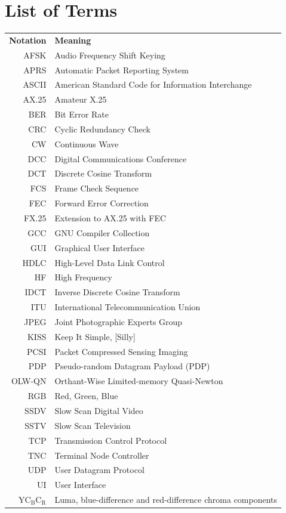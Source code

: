 \documentclass[letterpaper]{article}
\begin{document}
\section*{List of Terms}

\begin{tabularx}{\textwidth}{r X} 
\textbf{Notation} & \textbf{Meaning} \\
 AFSK & Audio Frequency Shift Keying  \\ 
 APRS & Automatic Packet Reporting System  \\ 
 ASCII & American Standard Code for Information Interchange \\
 AX.25 & Amateur X.25   \\ 
 BER & Bit Error Rate \\
 CRC & Cyclic Redundancy Check \\
 CW & Continuous Wave \\
 DCC & Digital Communications Conference \\
 DCT & Discrete Cosine Transform \\
 FCS & Frame Check Sequence \\
 FEC & Forward Error Correction \\
 FX.25 & Extension to AX.25 with FEC \\
 GCC & GNU Compiler Collection \\
 GUI & Graphical User Interface \\
 HDLC & High-Level Data Link Control \\
 HF & High Frequency \\
 IDCT & Inverse Discrete Cosine Transform \\
 ITU & International Telecommunication Union \\
 JPEG & Joint Photographic Experts Group \\
 KISS & Keep It Simple, [Silly] \\
 PCSI & Packet Compressed Sensing Imaging \\ 
 PDP & Pseudo-random Datagram Payload (PDP) \\
 OLW-QN & Orthant-Wise Limited-memory Quasi-Newton \\
 RGB & Red, Green, Blue \\
 SSDV & Slow Scan Digital Video \\
 SSTV & Slow Scan Television  \\
 TCP & Transmission Control Protocol \\
 TNC & Terminal Node Controller \\
 UDP & User Datagram Protocol \\
 UI & User Interface \\
 Y$\mathrm{C_B C_R}$ & Luma, blue-difference and red-difference chroma components \\
\end{tabularx}

\printbibliography[title={Bibliography}]
\end{document}
